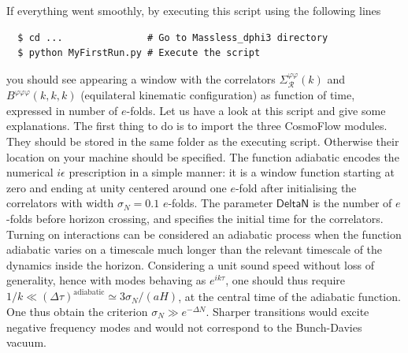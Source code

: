 \documentclass[11pt]{article}
\numberwithin{equation}{section} %
\def \Re {\mathcal{R}}
\begin{document}
If everything went smoothly, by executing this script using the following lines
\begin{eBox}
\begin{verbatim}
  $ cd ...               # Go to Massless_dphi3 directory
  $ python MyFirstRun.py # Execute the script
\end{verbatim}
\end{eBox}
you should see appearing a window with the correlators $\Sigma_\Re^{\varphi\varphi}(k)$ and $B^{\varphi\varphi\varphi}(k, k, k)$ (equilateral kinematic configuration) as function of time, expressed in number of $e$-folds. Let us have a look at this script and give some explanations. The first thing to do is to import the three \textsf{CosmoFlow} modules. They should be stored in the same folder as the executing script. Otherwise their location on your machine should be specified. The function \textsf{adiabatic} encodes the numerical $i\epsilon$ prescription in a simple manner: it is a window function starting at zero and ending at unity centered around one $e$-fold after initialising the correlators with width $\sigma_N=0.1$ $e$-folds. The parameter $\textsf{DeltaN}$ is the number of $e$-folds before horizon crossing, and specifies the initial time for the correlators.
Turning on interactions can be considered an adiabatic process when the function \textsf{adiabatic} varies on a timescale much longer than the relevant timescale of the dynamics inside the horizon. Considering a unit sound speed without loss of generality, hence with modes behaving as $e^{i k \tau}$, one should thus require $1/k \ll (\Delta \tau)^{\textrm{adiabatic}} \simeq 3 \sigma_N/(a H)$, at the central time of the \textsf{adiabatic} function. One thus obtain the criterion $\sigma_N \gg e^{-\Delta N}$. Sharper transitions would excite negative frequency modes and would not correspond to the Bunch-Davies vacuum.
\end{document}
